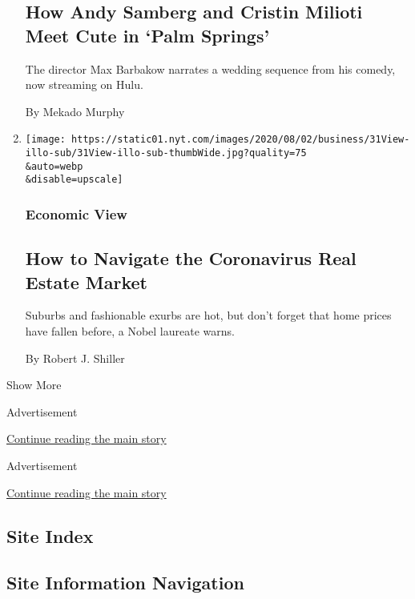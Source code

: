 \begin{enumerate}
  \hypertarget{how-andy-samberg-and-cristin-milioti-meet-cute-in-palm-springs-1}{%
  \subsection{How Andy Samberg and Cristin Milioti Meet Cute in `Palm
  Springs'}\label{how-andy-samberg-and-cristin-milioti-meet-cute-in-palm-springs-1}}

  The director Max Barbakow narrates a wedding sequence from his comedy,
  now streaming on Hulu.

  By Mekado Murphy
\item
  \href{/2020/07/31/business/housing-market-prices-risk.html}{}

  \texttt{[image: https://static01.nyt.com/images/2020/08/02/business/31View-illo-sub/31View-illo-sub-thumbWide.jpg?quality=75\\\&auto=webp\\\&disable=upscale]}

  \hypertarget{economic-view}{%
  \subsubsection{Economic View}\label{economic-view}}

  \hypertarget{how-to-navigate-the-coronavirus-real-estate-market}{%
  \subsection{How to Navigate the Coronavirus Real Estate
  Market}\label{how-to-navigate-the-coronavirus-real-estate-market}}

  Suburbs and fashionable exurbs are hot, but don't forget that home
  prices have fallen before, a Nobel laureate warns.

  By Robert J. Shiller
\end{enumerate}

Show More

Advertisement

\protect\hyperlink{after-mid4}{Continue reading the main story}

Advertisement

\protect\hyperlink{after-mktg}{Continue reading the main story}

\hypertarget{site-index}{%
\subsection{Site Index}\label{site-index}}

\hypertarget{site-information-navigation}{%
\subsection{Site Information
Navigation}\label{site-information-navigation}}

